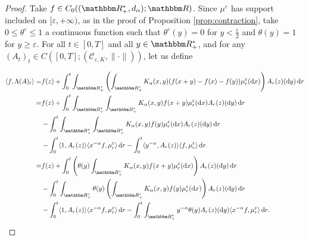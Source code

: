 \documentclass[a4paper,11pt, reqno]{amsart}
\newcommand{\cC}{\mathcal{C}}	\newcommand{\CC}{\mathbbm{C}}
\newcommand{\eps}{\varepsilon}
\newcommand{\dd}{\mathop{}\!\mathrm{d}}
\newcommand{\1}{\mathbbm{1}}
\theoremstyle{plain}
\theoremstyle{definition}
\begin{document}
\begin{proof}
  Take $f \in C_0 ((\RR_+^{\ast}, d_{\alpha}) ; \RR)$. Since
  $\mu^{\eps}$ has support included on $[\eps, + \infty)$, as in
  the proof of Proposition \ref{prop:contraction}, take $0 \le
  \theta^{\eps} \le 1$ a continuous function such that
  $\theta^{\eps} (y) = 0$ for $y < \frac{\eps}{2}$ and $\theta
  (y) = 1$ for $y \ge \eps$. For all $t \in [0, T]$ and all $y
  \in \RR_+^{\ast}$, and for any $(A_t)_t \in C ([0, T] ;
  (\cC_{\eps, K}, \| \cdot \|))$, let us define
  
  \begin{align*}
    \langle f, \Lambda (A)_t \rangle = & f (z) + \int_0^t
    \int_{\RR_+^{\ast}} \left( \int_{\RR_+^{\ast}} K_{\alpha}
    (x, y) (f (x + y) - f (x) - f (y)) \mu^{\eps}_r (\dd x) \right)
    A_r (z) (\dd y) \dd r\\
    = & f (z) + \int_0^t \int_{\RR_+^{\ast}} \int_{\RR_+^{\ast}}
    K_{\alpha} (x, y) f (x + y) \mu^{\eps}_r (\dd x) A_r (z) (\dd
    y) \dd r\\
    & - \int_0^t \int_{\RR_+^{\ast}} \int_{\RR_+^{\ast}}
    K_{\alpha} (x, y) f (y) \mu^{\eps}_r (\dd x) A_r (z) (\dd y)
    \dd r\\
    & - \int_0^t \langle 1, A_r (z) \rangle \langle x^{- \alpha} f,
    \mu^{\eps}_r \rangle \dd r - \int_0^t \langle y^{- \alpha}, A_r
    (z) \rangle \langle f, \mu^{\eps}_r \rangle \dd r.\\
    = & f (z) + \int_0^t \left( \theta (y) \int_{\RR_+^{\ast}}
    K_{\alpha} (x, y) f (x + y) \mu^{\eps}_r (\dd x) \right) A_r (z)
    (\dd y) \dd r\\
    & - \int_0^t \int_{\RR_+^{\ast}} \theta (y) \left(
    \int_{\RR_+^{\ast}} K_{\alpha} (x, y) f (y) \mu^{\eps}_r
    (\dd x) \right) A_r (z) (\dd y) \dd r\\
    & - \int_0^t \langle 1, A_r (z) \rangle \langle x^{- \alpha} f,
    \mu^{\eps}_r \rangle \dd r - \int_0^t \int_{\RR_+^{\ast}}
    y^{- \alpha} \theta (y) A_r (z) (\dd y) \langle x^{- \alpha} f,
    \mu^{\eps}_r \rangle \dd r.
  \end{align*}
  

\end{proof}
\end{document}
